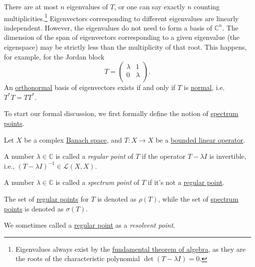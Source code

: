There are at most \(n\) eigenvalues of \(T\), or one can say exactly \(n\) counting multiplicities.\footnote{Eigenvalues always exist by the \href{https://en.wikipedia.org/wiki/Fundamental_theorem_of_algebra}{fundamental theorem of algebra}, as they are the roots of the characteristic polynomial \(\det(T - \lambda I) = 0 \).} Eigenvectors corresponding to different eigenvalues are linearly independent. However, the eigenvalues do not need to form a basis of \(\mathbb{C} ^n\). The dimension of the span of eigenvectors corresponding to a given eigenvalue (the eigenspace) may be strictly less than the multiplicity of that root. This happens, for example, for the Jordan block
\[
	T = \begin{pmatrix}
		\lambda & 1       \\
		0       & \lambda \\
	\end{pmatrix}.
\]
An \hyperref[def:orthonormal-system]{orthonormal} basis of eigenvectors exists if and only if \(T\) is \hyperref[def:normal-op]{normal}, i.e. \(T^{\ast} T = TT^{\ast} \).

To start our formal discussion, we first formally define the notion of \hyperref[def:spectrum-point]{spectrum points}.

\begin{definition*}
	Let \(X\) be a complex \hyperref[def:Banach-space]{Banach space}, and \(T\colon X \to X\) be a \hyperref[def:bounded-linear-op]{bounded linear operator}.
	\begin{definition}\label{def:regular-point}
		A number \(\lambda \in \mathbb{C} \) is called a \emph{regular point} of \(T\) if the operator \(T-\lambda I\) is invertible, i.e., \((T-\lambda I)^{-1} \in \mathcal{L} (X, X)\).
	\end{definition}
	\begin{definition}\label{def:spectrum-point}
		A number \(\lambda \in \mathbb{C} \) is called a \emph{spectrum point} of \(T\) if it's not a \hyperref[def:regular-point]{regular point}.
	\end{definition}
\end{definition*}

\begin{notation}
	The set of \hyperref[def:regular-point]{regular points} for \(T\) is denoted as \(\rho (T)\), while the set of \hyperref[def:spectrum-point]{spectrum points} is denoted as \(\sigma (T)\).
\end{notation}

\begin{remark}
	We sometimes called a \hyperref[def:regular-point]{regular point} as a \emph{resolvent point}.
\end{remark}

